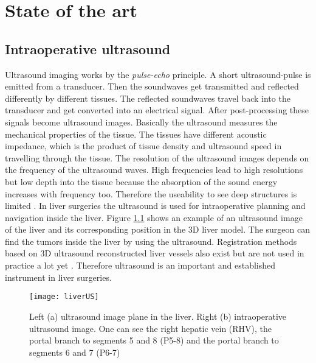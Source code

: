 \chapter{State of the art}

\section{Intraoperative ultrasound}
Ultrasound imaging works by the \textit{pulse-echo} principle. A short
ultrasound-pulse is emitted from a transducer. Then the soundwaves get
transmitted and reflected differently by different tissues. The reflected
soundwaves travel back into the transducer and get converted into an electrical
signal. After post-processing these signals become ultrasound images. Basically
the ultrasound measures the mechanical properties of the tissue. The tissues
have different acoustic impedance, which is the product of tissue density and
ultrasound speed in travelling through the tissue. The resolution of the
ultrasound images depends on the frequency of the ultrasound waves. High
frequencies lead to high resolutions but low depth into the tissue because the
absorption of the sound energy increases with frequency too. Therefore the
useability to see deep structures is limited \cite{torzilli2014ultrasound}. In
liver surgeries the ultrasound is used for intraoperative planning and
navigation inside the liver. Figure \ref{fig:liverUS} shows an example of an
ultrasound image of the liver and its corresponding position in the 3D liver
model. The surgeon can find the tumors inside the liver by using the ultrasound.
Registration methods based on 3D ultrasound reconstructed liver vessels also
exist but are not used in practice a lot yet \cite{lange2003vessel}. Therefore
ultrasound is an important and established instrument in liver surgeries.

\begin{figure}[H]
  \centering
 \texttt{[image: liverUS]}
 \caption{ Left (a) ultrasound image plane in the liver. Right (b) intraoperative
   ultrasound image. One can see the right hepatic vein (RHV), the portal branch
   to segments 5 and 8 (P5-8) and the portal branch to segments 6 and 7 (P6-7) \cite{torzilli2014ultrasound}}
  \label{fig:liverUS}
\end{figure}

